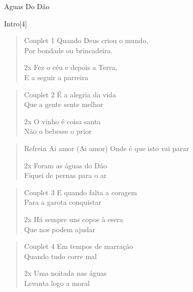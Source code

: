 \begin{song}[huayno]{Aguas Do Dão}
\begin{instrumental}{Intro}[4]
 \measure{}  \measure{}
   
\end{instrumental}

\begin{verse}{Couplet 1}
Quando Deus criou o mundo,\\ 		         
Por bondade ou brincadeira.\\
\begin{sidenote}{2x}
Fez o céu e depois a Terra,\\ 
E a seguir a parreira
\end{sidenote}
\end{verse}

\begin{verse}{Couplet 2}
É a alegria da vida\\ 		        
Que a gente sente melhor\\  
\begin{sidenote}{2x}         
O vinho é coisa santa\\
Não o bebesse o prior
\end{sidenote}
\end{verse}

\begin{verse}{Refrein}
Ai amor (Ai amor) Onde é que isto vai parar \\
\begin{sidenote}{2x}
Foram as águas do Dão\\
Fiquei de pernas para o ar
\end{sidenote}
\end{verse}


\begin{verse}{Couplet 3}
E quando falta a coragem\\ 
Para a garota conquistar \\
\begin{sidenote}{2x}
Há sempre uns copos à esera\\ 
Que nos podem ajudar
\end{sidenote}
\end{verse}

\begin{verse}{Couplet 4}
Em tempos de marração\\ 
Quando tudo corre mal \\
\begin{sidenote}{2x}
Uma noitada nas águas \\
Levanta logo a moral
\end{sidenote}
\end{verse}

\end{song}
\clearpage

